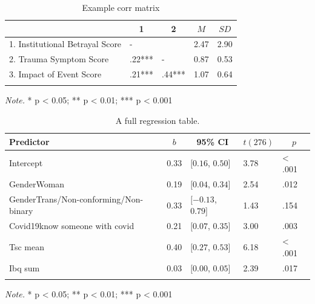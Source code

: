 \documentclass[
  english,
  man, noextraspace]{apa6}
\begin{document}
\begin{table}[tbp]

\begin{center}
\begin{threeparttable}

\caption{\label{tab:table1}Example corr matrix}

\begin{tabular}{lllll}
\toprule
 & \multicolumn{1}{c}{1} & \multicolumn{1}{c}{2} & \multicolumn{1}{c}{$M$} & \multicolumn{1}{c}{$SD$}\\
\midrule
1. Institutional Betrayal Score & - &  & 2.47 & 2.90\\
2. Trauma Symptom Score & .22*** & - & 0.87 & 0.53\\
3. Impact of Event Score & .21*** & .44*** & 1.07 & 0.64\\
\bottomrule
\addlinespace
\end{tabular}

\begin{tablenotes}[para]
\normalsize{\textit{Note.} * p < 0.05; ** p < 0.01; *** p < 0.001}
\end{tablenotes}

\end{threeparttable}
\end{center}

\end{table}

\begin{table}[tbp]

\begin{center}
\begin{threeparttable}

\caption{\label{tab:table2}A full regression table.}

\begin{tabular}{lllll}
\toprule
Predictor & \multicolumn{1}{c}{$b$} & \multicolumn{1}{c}{95\% CI} & \multicolumn{1}{c}{$t(276)$} & \multicolumn{1}{c}{$p$}\\
\midrule
Intercept & 0.33 & $[0.16$, $0.50]$ & 3.78 & < .001\\
GenderWoman & 0.19 & $[0.04$, $0.34]$ & 2.54 & .012\\
GenderTrans/Non-conforming/Non-binary & 0.33 & $[-0.13$, $0.79]$ & 1.43 & .154\\
Covid19know someone with covid & 0.21 & $[0.07$, $0.35]$ & 3.00 & .003\\
Tsc mean & 0.40 & $[0.27$, $0.53]$ & 6.18 & < .001\\
Ibq sum & 0.03 & $[0.00$, $0.05]$ & 2.39 & .017\\
\bottomrule
\addlinespace
\end{tabular}

\begin{tablenotes}[para]
\normalsize{\textit{Note.} * p < 0.05; ** p < 0.01; *** p < 0.001}
\end{tablenotes}

\end{threeparttable}
\end{center}

\end{table}
\end{document}

